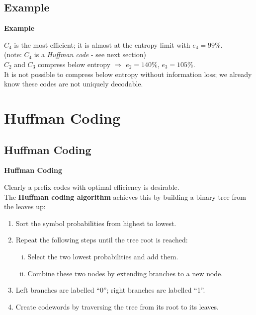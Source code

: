 \documentclass[compress]{beamer}        %
\makeatletter
\newcommand{\tcb}{\textcolor{beamer@blendedblue}}
\makeatother
\begin{document}
\subsection{Example}
\begin{frame}{\bf \tcb{Example}}

$C_4$ is the most efficient; it is almost at the entropy limit with $e_4 = 99\%$.\\[0.1cm]
{\footnotesize(note: $C_4$ is a \emph{Huffman code} - see next section)}\\[1.3cm]


$C_2$ and $C_3$ compress below entropy $\Rightarrow$ $e_2=140\%$, $e_3=105\%$.\\[0.8cm]

It is not possible to compress below entropy without information loss; we already know these codes are not uniquely decodable.



\end{frame}







\section{Huffman Coding}
\subsection{Huffman Coding}
\begin{frame}{\bf \tcb{Huffman Coding}}

Clearly a prefix codes with optimal efficiency is desirable.\\[0.4cm]

The {\bf Huffman coding algorithm} achieves this by building a binary tree from the leaves up:\\
\begin{enumerate}[1.]\itemsep0.6cm
\item Sort the symbol probabilities from highest to lowest.
\item Repeat the following steps until the tree root is reached:\\
\begin{enumerate}[(i)]\itemsep0.2cm
\item Select the two lowest probabilities and add them.
\item Combine these two nodes by extending branches to a new node.
\end{enumerate}
\item Left branches are labelled ``0''; right branches are labelled ``1''.
\item Create codewords by traversing the tree from its root to its leaves.
\end{enumerate}

\end{frame}
\end{document}
